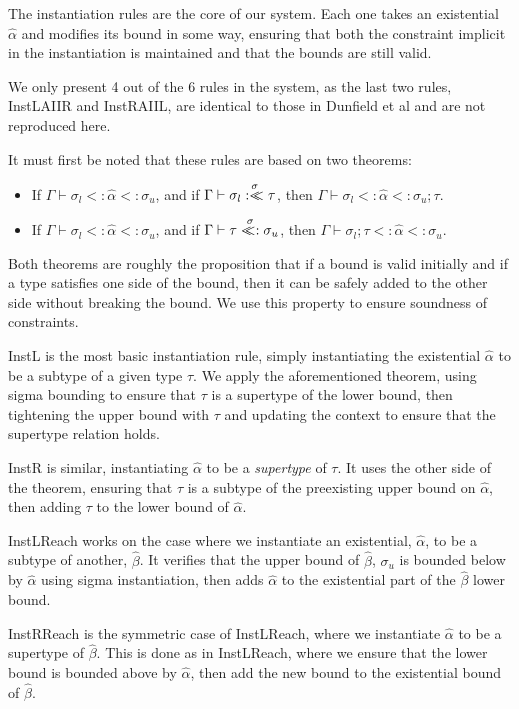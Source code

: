 \documentclass{sig-alternate}
\newcommand{\alphahat}{\hat{\alpha}}
\newcommand{\betahat}{\hat{\beta}}
\newcommand{\botbound}{\sigma_{l}}
\newcommand{\topbound}{\sigma_{u}}
\newcommand{\sigbndl}{\overset{\sigma}{:<\hspace{-5px}<}}
\newcommand{\sigbndr}{\overset{\sigma}{<\hspace{-5px}<:}}
\newcommand{\ctxtsep}{;}
\newcommand{\ctxbsep}{;}
\newcommand{\tst}{{\scriptstyle{<:}}}
\newcommand{\bound}[3]{#1 \tst #2 \tst #3}
\begin{document}
The instantiation rules are the core of our system. Each one takes an existential $\alphahat$ and modifies its bound in some way, ensuring that both the constraint implicit in the instantiation is maintained and that the bounds are still valid.

We only present 4 out of the 6 rules in the system, as the last two rules, InstLAIIR and InstRAIIL, are identical to those in Dunfield et al and are not reproduced here.

It must first be noted that these rules are based on two theorems: 
\begin{itemize}
\item If $\Gamma \vdash \bound{\botbound }{ \alphahat }{ \topbound}$, and if $\Gamma \vdash \botbound \sigbndl \tau$, then $\Gamma \vdash \bound{\botbound }{ \alphahat }{ \topbound \ctxtsep \tau}$.
\item If $\Gamma \vdash \bound{\botbound }{ \alphahat }{ \topbound}$, and if $\Gamma \vdash \tau \sigbndr \topbound$, then $\Gamma \vdash \bound{\botbound \ctxbsep \tau }{ \alphahat }{ \topbound}$.
\end{itemize}
Both theorems are roughly the proposition that if a bound is valid initially and if a type satisfies one side of the bound, then it can be safely added to the other side without breaking the bound. We use this property to ensure soundness of constraints.

InstL is the most basic instantiation rule, simply instantiating the existential $\alphahat$ to be a subtype of a given type $\tau$. We apply the aforementioned theorem, using sigma bounding to ensure that $\tau$ is a supertype of the lower bound, then tightening the upper bound with $\tau$ and updating the context to ensure that the supertype relation holds.

InstR is similar, instantiating $\alphahat$ to be a \emph{supertype} of $\tau$. It uses the other side of the theorem, ensuring that $\tau$ is a subtype of the preexisting upper bound on $\alphahat$, then adding $\tau$ to the lower bound of $\alphahat$.

InstLReach works on the case where we instantiate an existential, $\alphahat$, to be a subtype of another, $\betahat$. It verifies that the upper bound of $\betahat$, $\topbound$ is bounded below by $\alphahat$ using sigma instantiation, then adds $\alphahat$ to the existential part of the $\betahat$ lower bound.

InstRReach is the symmetric case of InstLReach, where we instantiate $\alphahat$ to be a supertype of $\betahat$. This is done as in InstLReach, where we ensure that the lower bound is bounded above by $\alphahat$, then add the new bound to the existential bound of $\betahat$.
\end{document}
